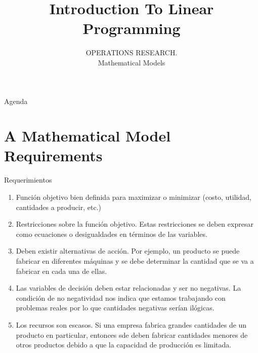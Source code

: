 \documentclass[../main.tex]{subfiles}
\title{Introduction To Linear Programming}
\subtitle{OPERATIONS RESEARCH. \\ Mathematical Models} %
\begin{document}
\begin{frame}
  \maketitle
\end{frame}


\begin{frame}{Agenda}
  \tableofcontents
\end{frame}


\section{A Mathematical Model Requirements}
\label{sec:formulations}

\begin{frame}{Requerimientos}
  \begin{enumerate} \parskip2mm \justifying
  \item<only@1> Función objetivo bien definida para maximizar o minimizar (costo, utilidad, cantidades a producir, etc.) 
  \item<only@1> Restricciones sobre la función objetivo. Estas restricciones se deben expresar como ecuaciones o desigualdades en términos de las variables.
  \item<only@1> Deben existir alternativas de acción. Por ejemplo, un producto se puede fabricar en diferentes máquinas y se debe determinar la cantidad que se va a fabricar en cada una de ellas. 
  \item<only@2> Las variables de decisión deben estar relacionadas y ser no negativas. La condición de no negatividad nos indica que estamos trabajando con problemas reales por lo que cantidades negativas serían ilógicas.
  \item<only@2> Los recursos son escasos. Si una empresa fabrica grandes cantidades de un producto en particular, entonces sde deben fabricar cantidades menores de otros productos debido a que la capacidad de producción es limitada.
  \end{enumerate}
\end{frame}
\end{document}
